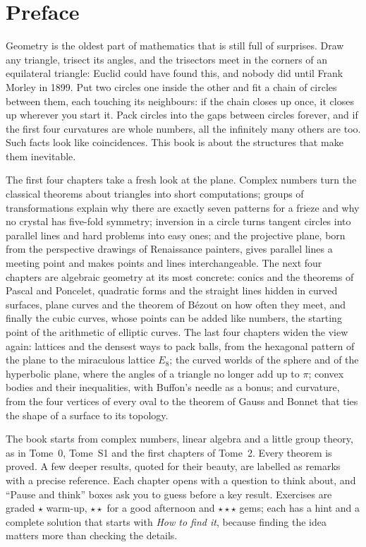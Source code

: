 \chapter*{Preface}
Geometry is the oldest part of mathematics that is still full of surprises. Draw any triangle, trisect its
angles, and the trisectors meet in the corners of an equilateral triangle: Euclid could have found this, and
nobody did until Frank Morley in 1899. Put two circles one inside the other and fit a chain of circles between
them, each touching its neighbours: if the chain closes up once, it closes up wherever you start it. Pack
circles into the gaps between circles forever, and if the first four curvatures are whole numbers, all the
infinitely many others are too. Such facts look like coincidences. This book is about the structures that make
them inevitable.

The first four chapters take a fresh look at the plane. Complex numbers turn the classical theorems about
triangles into short computations; groups of transformations explain why there are exactly seven patterns for
a frieze and why no crystal has five-fold symmetry; inversion in a circle turns tangent circles into parallel
lines and hard problems into easy ones; and the projective plane, born from the perspective drawings of
Renaissance painters, gives parallel lines a meeting point and makes points and lines interchangeable. The
next four chapters are algebraic geometry at its most concrete: conics and the theorems of Pascal and
Poncelet, quadratic forms and the straight lines hidden in curved surfaces, plane curves and the theorem of
B\'ezout on how often they meet, and finally the cubic curves, whose points can be added like numbers, the
starting point of the arithmetic of elliptic curves. The last four chapters widen the view again: lattices and
the densest ways to pack balls, from the hexagonal pattern of the plane to the miraculous lattice $E_8$; the
curved worlds of the sphere and of the hyperbolic plane, where the angles of a triangle no longer add up to
$\pi$; convex bodies and their inequalities, with Buffon's needle as a bonus; and curvature, from the four
vertices of every oval to the theorem of Gauss and Bonnet that ties the shape of a surface to its topology.

The book starts from complex numbers, linear algebra and a little group theory, as in Tome~0, Tome~S1 and
the first chapters of Tome~2. Every theorem is proved. A few deeper results, quoted for their beauty, are
labelled as remarks with a precise reference. Each chapter opens with a question to think about, and ``Pause
and think'' boxes ask you to guess before a key result. Exercises are graded \textbf{$\star$} warm-up,
\textbf{$\star\star$} for a good afternoon and \textbf{$\star\star\star$} gems; each has a hint and a complete
solution that starts with \emph{How to find it}, because finding the idea matters more than checking the details.

